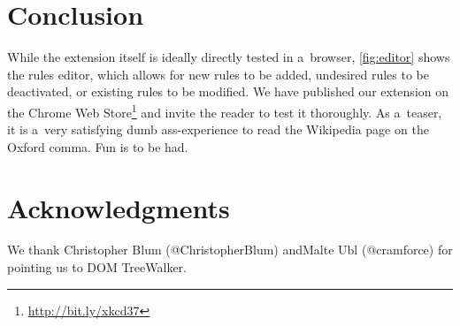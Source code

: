\documentclass{sig-alternate}
\let\oldttdefault\ttdefault
\renewcommand{\ttdefault}{pcr}
\renewcommand{\UrlFont}{\fontfamily{\oldttdefault}\selectfont}
\begin{document}
\section{Conclusion}
While the extension itself is ideally directly tested in \linebreak a~browser, \autoref{fig:editor} shows the rules editor,
which allows for new rules to be added, undesired rules to be deactivated, or existing rules to be modified.
We have published our extension on the Chrome Web Store\footnote{\url{http://bit.ly/xkcd37}} and invite the reader to test it thoroughly.
As a~teaser, it is a~very satisfying dumb ass-experience to read the Wikipedia page on the Oxford comma.
Fun is to be had.

\section{Acknowledgments}
We thank Christopher Blum ({\UrlFont @ChristopherBlum}) and\linebreak Malte Ubl ({\UrlFont @cramforce}) for pointing us to DOM TreeWalker.




\balancecolumns
\end{document}
